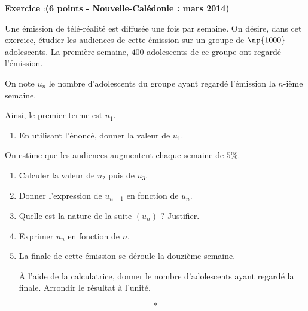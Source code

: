 \documentclass[11pt,french]{article}
\newcounter{exoc}
\newenvironment{exoc}[1]{%
  \refstepcounter{exoc}\textbf{Exercice \theexoc} :\hfill {\footnotesize\textbf{(#1)}}\par
  \medskip}%
{\medskip}
\begin{document}

\begin{exoc}{6 points - Nouvelle-Calédonie : mars 2014}
    Une émission de télé-réalité est diffusée une fois par semaine. On désire, dans cet exercice, étudier les audiences de cette émission sur un groupe de $\np{1000}$ adolescents. La première semaine, $400$ adolescents de ce groupe ont regardé l'émission.\par\smallskip
    On note $u_n$ le nombre d'adolescents du groupe ayant regardé l'émission la $n$-ième semaine. \par Ainsi, le premier terme est $u_1$.

    \begin{enumerate}
        \item En utilisant l'énoncé, donner la valeur de $u_1$.
    \end{enumerate}

    On estime que les audiences augmentent chaque semaine de $5\%$.

    \begin{enumerate}[resume]
        \item Calculer la valeur de $u_2$ puis de $u_3$.
        \item Donner l'expression de $u_{n+1}$ en fonction de $u_n$.
        \item Quelle est la nature de la suite $(u_n)$ ? Justifier.
        \item Exprimer $u_n$ en fonction de $n$.
        \item La finale de cette émission se déroule la douzième semaine.\par
        À l'aide de la calculatrice, donner le nombre d'adolescents ayant regardé la finale. Arrondir le résultat à l'unité.
    \end{enumerate}
\end{exoc}
\[*\]\clearpage

\end{document}
